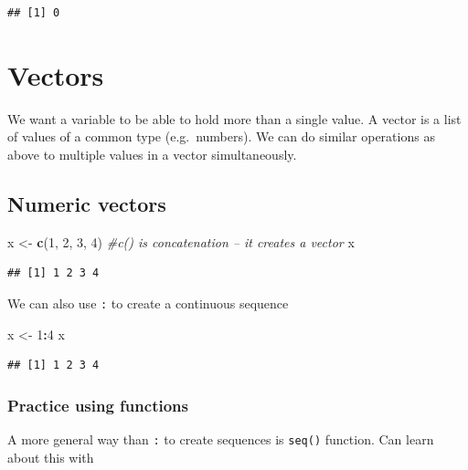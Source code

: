 \documentclass[]{article}
\newenvironment{Shaded}{\begin{snugshade}}{\end{snugshade}}
\newcommand{\KeywordTok}[1]{\textcolor[rgb]{0.13,0.29,0.53}{\textbf{#1}}}
\newcommand{\DecValTok}[1]{\textcolor[rgb]{0.00,0.00,0.81}{#1}}
\newcommand{\StringTok}[1]{\textcolor[rgb]{0.31,0.60,0.02}{#1}}
\newcommand{\CommentTok}[1]{\textcolor[rgb]{0.56,0.35,0.01}{\textit{#1}}}
\newcommand{\OperatorTok}[1]{\textcolor[rgb]{0.81,0.36,0.00}{\textbf{#1}}}
\newcommand{\NormalTok}[1]{#1}
\begin{document}
\begin{verbatim}
## [1] 0
\end{verbatim}

\section{Vectors}\label{vectors}

We want a variable to be able to hold more than a single value. A vector
is a list of values of a common type (e.g.~numbers). We can do similar
operations as above to multiple values in a vector simultaneously.

\subsection{Numeric vectors}\label{numeric-vectors}

\begin{Shaded}
\begin{Highlighting}[]
\NormalTok{x <-}\StringTok{ }\KeywordTok{c}\NormalTok{(}\DecValTok{1}\NormalTok{, }\DecValTok{2}\NormalTok{, }\DecValTok{3}\NormalTok{, }\DecValTok{4}\NormalTok{) }\CommentTok{#c() is concatenation -- it creates a vector}
\NormalTok{x}
\end{Highlighting}
\end{Shaded}

\begin{verbatim}
## [1] 1 2 3 4
\end{verbatim}

We can also use \texttt{:} to create a continuous sequence

\begin{Shaded}
\begin{Highlighting}[]
\NormalTok{x <-}\StringTok{ }\DecValTok{1}\OperatorTok{:}\DecValTok{4}
\NormalTok{x}
\end{Highlighting}
\end{Shaded}

\begin{verbatim}
## [1] 1 2 3 4
\end{verbatim}

\subsubsection{Practice using functions}\label{practice-using-functions}

A more general way than \texttt{:} to create sequences is \texttt{seq()}
function. Can learn about this with
\end{document}
